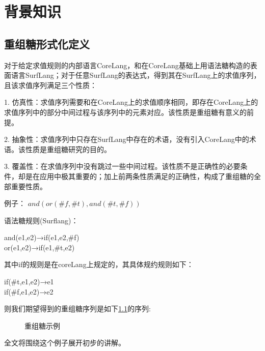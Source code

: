 \pagestyle{fancy}
\normalsize
\linespread{1.5}\selectfont
\label{mark:chapter2}\chapter{背景知识}

\section{重组糖形式化定义}
\label{mark:resugaring}对于给定求值规则的内部语言CoreLang，和在CoreLang基础上用语法糖构造的表面语言SurfLang；对于任意SurfLang的表达式，得到其在SurfLang上的求值序列，且该求值序列满足三个性质：

1.	仿真性：求值序列需要和在CoreLang上的求值顺序相同，即存在CoreLang上的求值序列中的部分中间过程与该序列中的元素对应。该性质是重组糖有意义的前提。

2.	抽象性：求值序列中只存在SurfLang中存在的术语，没有引入CoreLang中的术语。该性质是重组糖研究的目的。

3.	覆盖性：在求值序列中没有跳过一些中间过程。该性质不是正确性的必要条件，却是在应用中极其重要的；加上前两条性质满足的正确性，构成了重组糖的全部重要性质。

例子：
$and(or(\#f,\#t),and(\#t,\#f))$

语法糖规则(Surflang)：
\begin{center}
	\parbox[t]{\textwidth}{%
		\begin{center}  
			and(e1,e2)→if(e1,e2,\#f)\\
			or(e1,e2)→if(e1,\#t,e2)
		\end{center}  
	}%
\end{center}



其中if的规则是在coreLang上规定的，其具体规约规则如下：
\begin{center}
	\parbox[t]{\textwidth}{%
		\begin{center}  
			if(\#t,e1,e2)→e1\\
			if(\#f,e1,e2)→e2
		\end{center}  
	}%
\end{center}
 

则我们期望得到的重组糖序列是如下\ref{fig:example}的序列:

\begin{figure}[h]
	
\caption{重组糖示例}
\label{fig:example}
\end{figure}
全文将围绕这个例子展开初步的讲解。

